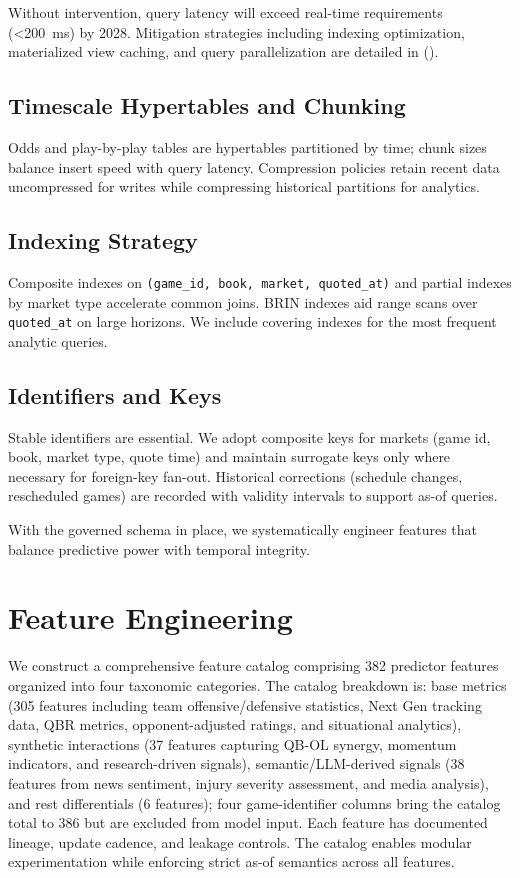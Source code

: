 Without intervention, query latency will exceed real-time requirements (\SI{<200}{ms}) by 2028. Mitigation strategies including indexing optimization, materialized view caching, and query parallelization are detailed in  ().

\subsection{Timescale Hypertables and Chunking}
Odds and play-by-play tables are hypertables partitioned by time; chunk sizes balance insert speed with query latency. Compression policies retain recent data uncompressed for writes while compressing historical partitions for analytics.

\subsection{Indexing Strategy}
Composite indexes on \texttt{(game\_id, book, market, quoted\_at)} and partial indexes by market type accelerate common joins. BRIN indexes aid range scans over \texttt{quoted\_at} on large horizons. We include covering indexes for the most frequent analytic queries.

\subsection{Identifiers and Keys}
Stable identifiers are essential. We adopt composite keys for markets (game id, book, market type, quote time) and maintain surrogate keys only where necessary for foreign-key fan-out. Historical corrections (schedule changes, rescheduled games) are recorded with validity intervals to support as-of queries.

With the governed schema in place, we systematically engineer features that balance predictive power with temporal integrity.

\section{Feature Engineering}
\label{sec:feature-engineering}

We construct a comprehensive feature catalog comprising 382 predictor features organized into four taxonomic categories. The catalog breakdown is: base metrics (305 features including team offensive/defensive statistics, Next Gen tracking data, QBR metrics, opponent-adjusted ratings, and situational analytics), synthetic interactions (37 features capturing QB-OL synergy, momentum indicators, and research-driven signals), semantic/LLM-derived signals (38 features from news sentiment, injury severity assessment, and media analysis), and rest differentials (6 features); four game-identifier columns bring the catalog total to 386 but are excluded from model input. Each feature has documented lineage, update cadence, and leakage controls. The catalog enables modular experimentation while enforcing strict as-of semantics across all features.

